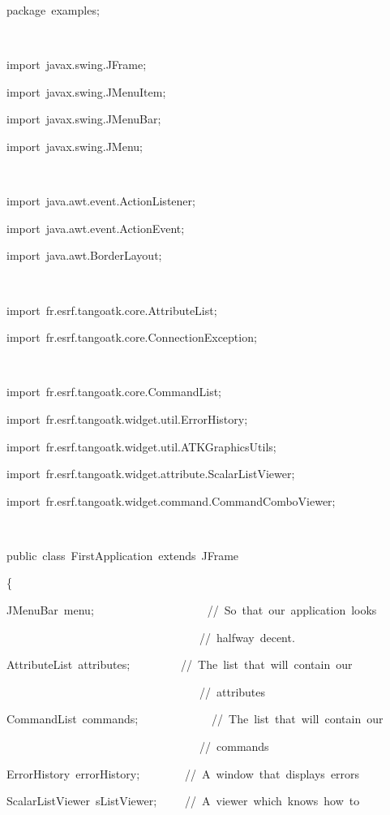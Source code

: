 
\begin{lyxcode}
package~examples;

~



import~javax.swing.JFrame;

import~javax.swing.JMenuItem;

import~javax.swing.JMenuBar;

import~javax.swing.JMenu;

~



import~java.awt.event.ActionListener;

import~java.awt.event.ActionEvent;

import~java.awt.BorderLayout;

~



import~fr.esrf.tangoatk.core.AttributeList;

import~fr.esrf.tangoatk.core.ConnectionException;

~



import~fr.esrf.tangoatk.core.CommandList;

import~fr.esrf.tangoatk.widget.util.ErrorHistory;

import~fr.esrf.tangoatk.widget.util.ATKGraphicsUtils;

import~fr.esrf.tangoatk.widget.attribute.ScalarListViewer;

import~fr.esrf.tangoatk.widget.command.CommandComboViewer;

~



public~class~FirstApplication~extends~JFrame

\{

JMenuBar~menu;~~~~~~~~~~~~~~~~~~~~//~So~that~our~application~looks

~~~~~~~~~~~~~~~~~~~~~~~~~~~~~~~~~~//~halfway~decent.

AttributeList~attributes;~~~~~~~~~//~The~list~that~will~contain~our

~~~~~~~~~~~~~~~~~~~~~~~~~~~~~~~~~~//~attributes

CommandList~commands;~~~~~~~~~~~~~//~The~list~that~will~contain~our

~~~~~~~~~~~~~~~~~~~~~~~~~~~~~~~~~~//~commands

ErrorHistory~errorHistory;~~~~~~~~//~A~window~that~displays~errors

ScalarListViewer~sListViewer;~~~~~//~A~viewer~which~knows~how~to


\end{lyxcode}
